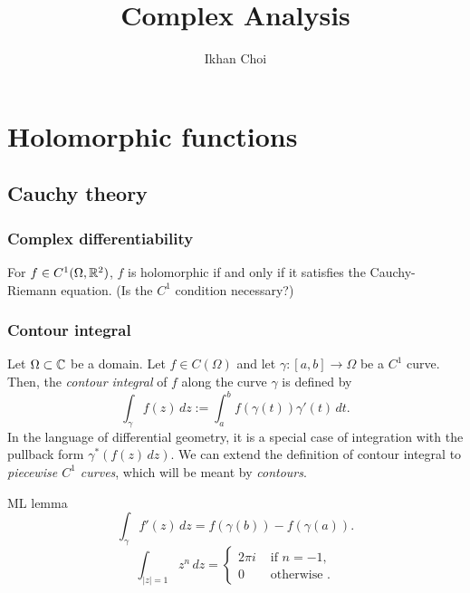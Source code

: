 \documentclass{../note}
\begin{document}
\title{Complex Analysis}
\author{Ikhan Choi}
\maketitle
\tableofcontents


\part{Holomorphic functions}


\chapter{Cauchy theory}
\section{Complex differentiability}

\begin{prb}
\end{prb}

\begin{prb}
\begin{parts}
\item For $f\in C^1(\Omega,\mathbb{R}^2)$, $f$ is holomorphic if and only if it satisfies the Cauchy-Riemann equation. (Is the $C^1$ condition necessary?)
\end{parts}
\end{prb}


\section{Contour integral}
\begin{prb}
Let $\Omega\subset\mathbb{C}$ be a domain.
Let $f\in C(\Omega)$ and let $\gamma:[a,b]\to\Omega$ be a $C^1$ curve.
Then, the \emph{contour integral} of $f$ along the curve $\gamma$ is defined by
\[\int_\gamma f(z)\,dz:=\int_a^bf(\gamma(t))\gamma'(t)\,dt.\]
In the language of differential geometry, it is a special case of integration with the pullback form $\gamma^*(f(z)\,dz)$.
We can extend the definition of contour integral to \emph{piecewise $C^1$ curves}, which will be meant by \emph{contours}.
\end{prb}
ML lemma
\[\int_\gamma f'(z)\,dz=f(\gamma(b))-f(\gamma(a)).\]
\[\int_{|z|=1}z^n\,dz=\begin{cases}2\pi i&\text{ if }n=-1,\\0&\text{ otherwise }.\end{cases}\]
\end{document}

